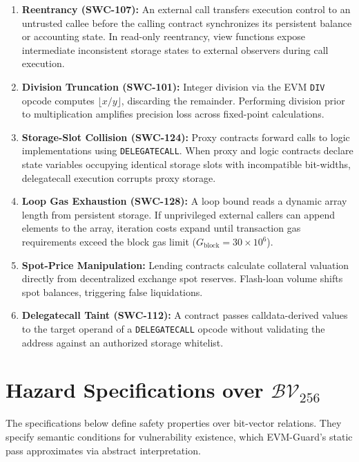 \documentclass[pdflatex,sn-mathphys]{sn-jnl}
\theoremstyle{thmstyleone}
\theoremstyle{thmstyletwo}
\begin{document}
\begin{enumerate}
    \item \textbf{Reentrancy (SWC-107):} An external call transfers execution control to an untrusted callee before the calling contract synchronizes its persistent balance or accounting state. In read-only reentrancy, view functions expose intermediate inconsistent storage states to external observers during call execution.
    \item \textbf{Division Truncation (SWC-101):} Integer division via the EVM \texttt{DIV} opcode computes $\lfloor x / y \rfloor$, discarding the remainder. Performing division prior to multiplication amplifies precision loss across fixed-point calculations.
    \item \textbf{Storage-Slot Collision (SWC-124):} Proxy contracts forward calls to logic implementations using \texttt{DELEGATECALL}. When proxy and logic contracts declare state variables occupying identical storage slots with incompatible bit-widths, delegatecall execution corrupts proxy storage.
    \item \textbf{Loop Gas Exhaustion (SWC-128):} A loop bound reads a dynamic array length from persistent storage. If unprivileged external callers can append elements to the array, iteration costs expand until transaction gas requirements exceed the block gas limit ($G_{\mathrm{block}} = 30 \times 10^6$).
    \item \textbf{Spot-Price Manipulation:} Lending contracts calculate collateral valuation directly from decentralized exchange spot reserves. Flash-loan volume shifts spot balances, triggering false liquidations.
    \item \textbf{Delegatecall Taint (SWC-112):} A contract passes calldata-derived values to the target operand of a \texttt{DELEGATECALL} opcode without validating the address against an authorized storage whitelist.
\end{enumerate}

\section{Hazard Specifications over \texorpdfstring{$\mathcal{BV}_{256}$}{BV256}}\label{sec:formal_framework}

The specifications below define safety properties over bit-vector relations. They specify semantic conditions for vulnerability existence, which EVM-Guard's static pass approximates via abstract interpretation.
\end{document}
